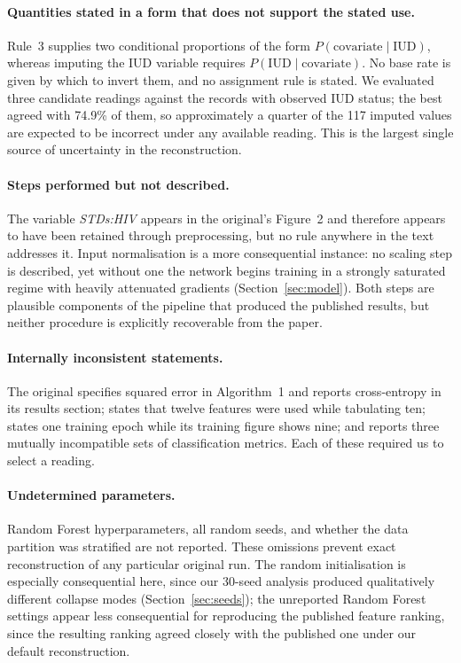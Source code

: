 \paragraph{Quantities stated in a form that does not support the stated use.}
Rule~3 supplies two conditional proportions of the form
$P(\text{covariate} \mid \text{IUD})$, whereas imputing the IUD variable
requires $P(\text{IUD} \mid \text{covariate})$. No base rate is given by which
to invert them, and no assignment rule is stated. We evaluated three candidate
readings against the records with observed IUD status; the best agreed with
74.9\% of them, so approximately a quarter of the 117 imputed values are
expected to be incorrect under any available reading. This is the largest
single source of uncertainty in the reconstruction.

\paragraph{Steps performed but not described.} The variable \emph{STDs:HIV}
appears in the original's Figure~2 and therefore appears to have been retained
through preprocessing, but no rule anywhere in the text addresses it. Input
normalisation is a more consequential instance: no scaling step is described,
yet without one the network begins training in a strongly saturated regime with
heavily attenuated gradients (Section~\ref{sec:model}). Both steps are
plausible components of the pipeline that produced the published results, but
neither procedure is explicitly recoverable from the paper.

\paragraph{Internally inconsistent statements.} The original specifies squared
error in Algorithm~1 and reports cross-entropy in its results section; states
that twelve features were used while tabulating ten; states one training epoch
while its training figure shows nine; and reports three mutually incompatible
sets of classification metrics. Each of these required us to select a reading.

\paragraph{Undetermined parameters.} Random Forest hyperparameters, all random
seeds, and whether the data partition was stratified are not reported. These
omissions prevent exact reconstruction of any particular original run. The
random initialisation is especially consequential here, since our 30-seed
analysis produced qualitatively different collapse modes
(Section~\ref{sec:seeds}); the unreported Random Forest settings appear less
consequential for reproducing the published feature ranking, since the
resulting ranking agreed closely with the published one under our default
reconstruction.


